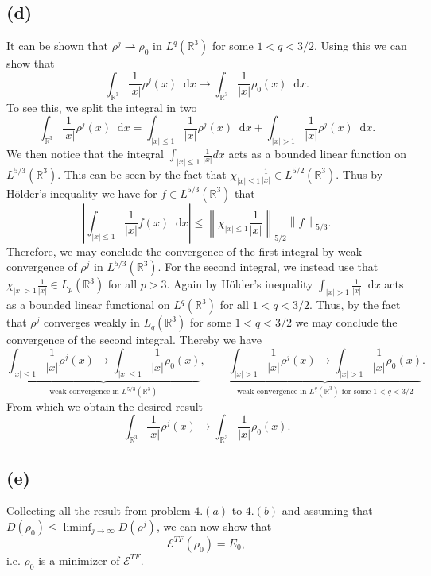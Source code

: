 \documentclass[a4paper,11pt]{article}
\newcommand{\norm}[1]{\left\lVert #1 \right\rVert}
\newcommand{\abs}[1]{\left\lvert #1 \right\rvert}
\newcommand*\diff{\mathop{}\!\mathrm{d}}
\newcommand{\R}{\mathbb{R}}
\numberwithin{equation}{section}
\begin{document}
\subsection*{(d)}
It can be shown that $ \rho^j\rightharpoonup\rho_0 $ in $ L^q(\R^3) $ for some $ 1<q<3/2 $. Using this we can show that \begin{equation}
\int_{\R^3}\frac{1}{\abs{x}}\rho^j(x)\diff x\to\int_{\R^3}\frac{1}{\abs{x}}\rho_0(x)\diff x.
\end{equation}
To see this, we split the integral in two\begin{equation}
\int_{\R^3}\frac{1}{\abs{x}}\rho^j(x)\diff x=\int_{\abs{x}\leq1}\frac{1}{\abs{x}}\rho^j(x)\diff x+\int_{\abs{x}>1}\frac{1}{\abs{x}}\rho^j(x)\diff x.
\end{equation}
We then notice that the integral $ \int_{\abs{x}\leq1}\frac{1}{\abs{x}}dx $ acts as a bounded linear function on $ L^{5/3}(\R^3) $. This can be seen by the fact that $ \chi_{\abs{x}\leq1}\frac{1}{\abs{x}}\in L^{5/2}(\R^3) $. Thus by H\"older's inequality we have for $ f\in L^{5/3}(\R^3) $ that\begin{equation}
\abs{\int_{\abs{x}\leq 1}\frac{1}{\abs{x}}f(x)\diff x}\leq\norm{\chi_{\abs{x}\leq1}\frac{1}{\abs{x}}}_{5/2}\norm{f}_{5/3}.
\end{equation}
Therefore, we may conclude the convergence of the first integral by weak convergence of $ \rho^j $ in $ L^{5/3}(\R^3) $. For the second integral, we instead use that $ \chi_{\abs{x}>1}\frac{1}{\abs{x}}\in L_p(\R^3) $ for all $ p>3 $. Again by H\"older's inequality $ \int_{\abs{x}>1}\frac{1}{\abs{x}}\diff x $ acts as a bounded linear functional on $ L^q(\R^3) $ for all $ 1<q<3/2 $. Thus, by the fact that $ \rho^j $ converges weakly in $ L_q(\R^3) $ for some $ 1<q<3/2 $ we may conclude the convergence of the second integral. Thereby we have \begin{equation}
\underbrace{\int_{\abs{x}\leq1}\frac{1}{\abs{x}}\rho^j(x)\to\int_{\abs{x}\leq1}\frac{1}{\abs{x}}\rho_0(x)}_{\text{weak convergence in }L^{5/3}(\R^3)},\qquad \underbrace{\int_{\abs{x}>1}\frac{1}{\abs{x}}\rho^j(x)\to\int_{\abs{x}>1}\frac{1}{\abs{x}}\rho_0(x)}_{\text{weak convergence in }L^{q}(\R^3)\text{ for some }1<q<3/2}.
\end{equation}
From which we obtain the desired result \begin{equation}
\int_{\R^3}\frac{1}{\abs{x}}\rho^j(x)\to\int_{\R^3}\frac{1}{\abs{x}}\rho_0(x).
\end{equation}
\subsection*{(e)}
Collecting all the result from problem $ 4.(a) $ to $ 4.(b) $ and assuming that $ D(\rho_0)\leq\liminf_{j\to\infty}D(\rho^j) $, we can now show that \begin{equation}
\mathcal{E}^{TF}(\rho_0)=E_0,
\end{equation}
i.e. $ \rho_0 $ is a minimizer of $ \mathcal{E}^{TF} $.
\end{document}
